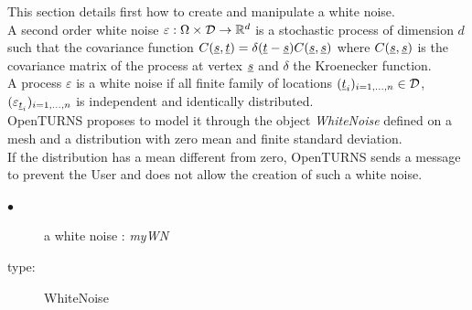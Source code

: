 \renewcommand{\filename}{docUC_StochProc_WhiteNoise.tex}
\renewcommand{\filetitle}{UC : Creation of a White Noise}

\HeaderIIILevel


\label{whiteNoise}


This section details first how to create and manipulate a white noise.\\

A second order white noise $\varepsilon: \Omega \times {\mathcal D} \rightarrow {\mathbb R}^d$  is a stochastic process of dimension $d$ such that the covariance function $C({\underline{s}},{\underline{t}})=\delta({\underline{t}}-{\underline{s}})C({\underline{s}},{\underline{s}})$ where $C({\underline{s}},{\underline{s}})$  is the covariance matrix of the process at vertex ${\underline{s}}$ and $\delta$ the Kroenecker function.\\

A process $\varepsilon$ is a white noise if  all finite family of locations  $({\underline{t}}_i)_{i=1, \dots, n} \in {\mathcal D}$, $(\varepsilon_{{\underline{t}}_i})_{i=1, \dots, n}$ is independent and identically distributed.\\

OpenTURNS proposes to model it through the object  \emph{WhiteNoise} defined on a mesh  and a distribution with zero mean and finite standard deviation.\\
If the distribution has a mean different from zero, OpenTURNS sends a message to prevent the User and does not allow the creation of such a white noise.\\

{
  \begin{description}
  \item[$\bullet$] a white noise : {\itshape myWN}
  \item[type:]  WhiteNoise
  \end{description}
}

